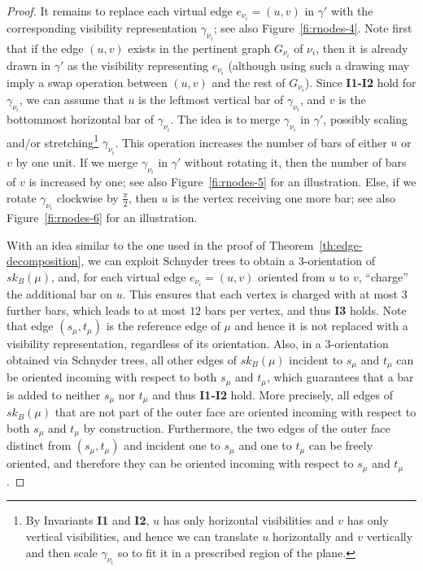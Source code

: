 \documentclass{article}
\newcommand{\ph}{\frac{\pi}{2}}
\begin{document}
\begin{proof}
It remains to replace each virtual edge $e_{\nu_i}=(u,v)$ in $\gamma'$ with the corresponding visibility representation $\gamma_{\nu_i}$; see also Figure~\ref{fi:rnodes-4}. Note first that if the edge $(u,v)$ exists in the pertinent graph $G_{\nu_i}$ of $\nu_i$, then it is already drawn in $\gamma'$ as the visibility representing $e_{\nu_i}$ (although using such a drawing may imply a swap operation between $(u,v)$ and the rest of $G_{\nu_i}$). Since {\bf I1-I2} hold for $\gamma_{\nu_i}$, we can assume that $u$ is the leftmost vertical bar of $\gamma_{\nu_i}$, and $v$ is the bottommost horizontal bar of $\gamma_{\nu_i}$. The idea is to merge $\gamma_{\nu_i}$ in $\gamma'$, possibly scaling and/or stretching\footnote{By Invariants {\bf I1} and {\bf I2}, $u$ has only horizontal visibilities and $v$ has only vertical visibilities, and hence we can translate $u$ horizontally and $v$ vertically and then scale $\gamma_{\nu_i}$ so to fit it in a prescribed region of the plane.} $\gamma_{\nu_i}$. This operation increases  the number of bars of either $u$ or $v$ by one unit. If we merge $\gamma_{\nu_i}$ in $\gamma'$ without rotating it, then the number of bars of $v$ is increased by one; see also Figure~\ref{fi:rnodes-5} for an illustration. Else, if we rotate $\gamma_{\nu_i}$ clockwise by $\ph$, then $u$ is the vertex receiving one more bar; see also Figure~\ref{fi:rnodes-6} for an illustration.


With an idea similar to the one used in the proof of Theorem~\ref{th:edge-decomposition}, we can exploit Schnyder trees to obtain a 3-orientation of $sk_B(\mu)$, and, for each virtual edge $e_{\nu_i}=(u,v)$ oriented from $u$ to $v$, ``charge'' the additional bar on $u$. This ensures that each vertex is charged with at most 3 further bars, which leads to at most $12$ bars per vertex, and thus {\bf I3} holds. Note that edge $(s_\mu,t_\mu)$ is the reference edge of $\mu$ and hence it is not replaced with a visibility representation, regardless of its orientation. Also, in a 3-orientation obtained via Schnyder trees, all other edges of $sk_B(\mu)$ incident to $s_\mu$ and $t_\mu$ can be oriented incoming with respect to both $s_\mu$ and $t_\mu$, which guarantees that a bar is added to neither $s_\mu$ nor $t_\mu$ and thus {\bf I1-I2} hold. More precisely, all edges of $sk_B(\mu)$ that are not part of the outer face are oriented incoming with respect to both $s_\mu$ and $t_\mu$ by construction. Furthermore, the two edges of the outer face distinct from $(s_\mu,t_\mu)$ and incident one to $s_\mu$ and one to $t_\mu$ can be freely oriented, and therefore they can be oriented incoming with respect to $s_\mu$ and $t_\mu$.
\end{proof}
\end{document}
